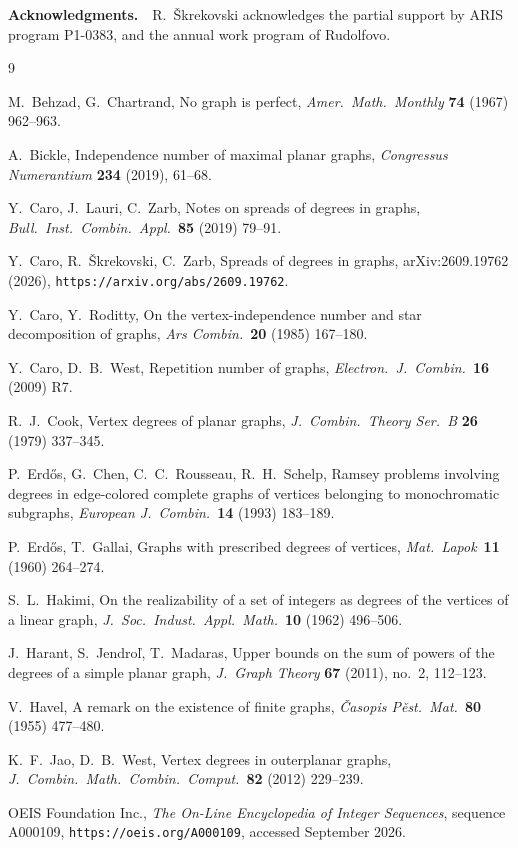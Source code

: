 \documentclass[12pt,a4paper]{article}%
\begin{document}
\bigskip\noindent\textbf{Acknowledgments.}~~R.~\v{S}krekovski acknowledges the partial support by ARIS program P1-0383, and the annual work program of Rudolfovo.

\begin{thebibliography}{9}

M.~Behzad, G.~Chartrand, No graph is perfect, \emph{Amer.\ Math.\
Monthly} \textbf{74} (1967) 962--963.


A.~Bickle, Independence number of maximal planar graphs,
\emph{Congressus Numerantium} \textbf{234} (2019), 61--68.

Y.~Caro, J.~Lauri, C.~Zarb, Notes on spreads of degrees in graphs,
\emph{Bull.\ Inst.\ Combin.\ Appl.}\ \textbf{85} (2019) 79--91.

Y.~Caro, R.~\v{S}krekovski, C.~Zarb, Spreads of degrees in graphs, arXiv:2609.19762
(2026), \texttt{https://arxiv.org/abs/2609.19762}.



Y.~Caro, Y.~Roditty, On the vertex-independence number and star decomposition of
graphs, \emph{Ars Combin.}\ \textbf{20} (1985) 167--180.

Y.~Caro, D.~B.~West, Repetition number of graphs, \emph{Electron.\ J.\
Combin.}\ \textbf{16} (2009) R7.

R.~J.~Cook, Vertex degrees of planar graphs, \emph{J.\ Combin.\ Theory Ser.\ B}
\textbf{26} (1979) 337--345.


P.~Erd\H{o}s, G.~Chen, C.~C.~Rousseau, R.~H.~Schelp, Ramsey problems involving
degrees in edge-colored complete graphs of vertices belonging to monochromatic subgraphs,
\emph{European J.\ Combin.}\ \textbf{14} (1993) 183--189.

P.~Erd\H{o}s, T.~Gallai, Graphs with prescribed degrees of vertices,
\emph{Mat.\ Lapok}\ \textbf{11} (1960) 264--274.

S.~L.~Hakimi, On the realizability of a set of integers as degrees of the
vertices of a linear graph, \emph{J.\ Soc.\ Indust.\ Appl.\ Math.}\ \textbf{10} (1962) 496--506.

\bibitem {HarantJendrolMadaras}J.~Harant, S.~Jendro\v{l}, T.~Madaras, Upper bounds on the sum of powers
of the degrees of a simple planar graph, \emph{J.\ Graph Theory} \textbf{67} (2011), no.~2, 112--123.

\bibitem {Havel}V.~Havel, A remark on the existence of finite graphs, \emph{\v{C}asopis P\v{e}st.\
Mat.}\ \textbf{80} (1955) 477--480.

\bibitem {JaoWest}K.~F.~Jao, D.~B.~West, Vertex degrees in outerplanar graphs, \emph{J.\ Combin.\
Math.\ Combin.\ Comput.}\ \textbf{82} (2012) 229--239.

OEIS Foundation Inc., \emph{The On-Line Encyclopedia of Integer Sequences},
sequence A000109, \texttt{https://oeis.org/A000109}, accessed September 2026.

\end{thebibliography}
\end{document}
